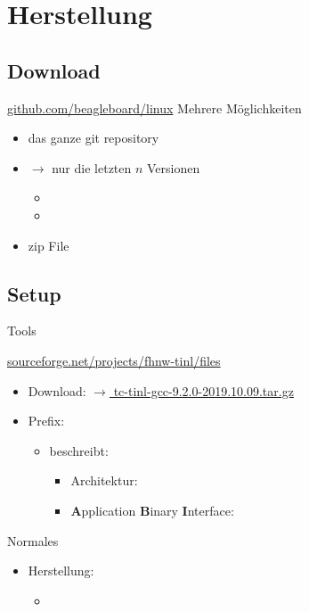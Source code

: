 \section{Herstellung}

\subsection{Download}
\begin{frame}{\url{github.com/beagleboard/linux}}
             {Mehrere Möglichkeiten}
 \begin{itemize}
  \item das ganze git repository
  \item {$\to$ \Large nur die letzten $n$ Versionen }
  \begin{itemize}
   \item {}
   \item {}
  \end{itemize}
  \item zip File 
 \end{itemize}
\end{frame}

\subsection{Setup}
\begin{frame}{Tools}%
 \begin{description}[toolchain]
 
  \item[toolchain] {\small \url{sourceforge.net/projects/fhnw-tinl/files}}
   \begin{itemize}
    \item 
    Download: \href{https://drive.switch.ch/index.php/s/6Hmx59Dz9rm6p2n}
         {$\to$ tc-tinl-gcc-9.2.0-2019.10.09.tar.gz}
    
   \item Prefix: 
    \begin{itemize}
     \item beschreibt:
     \begin{itemize}
      \item Architektur: 
      \item {\bf A}pplication {\bf B}inary {\bf I}nterface: 
     \end{itemize}
    \end{itemize}
    \end{itemize}
  \item[make] Normales 
  \begin{itemize}
   \item {} Herstellung:
   \begin{itemize}
    \item {}
   \end{itemize}
  \end{itemize}
 \end{description}
\end{frame}

